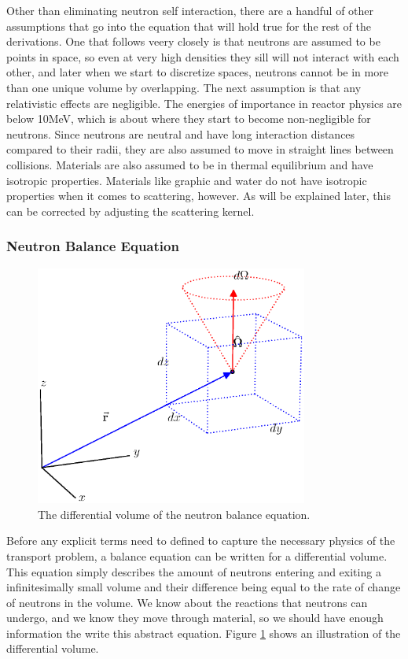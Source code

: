 Other than eliminating neutron self interaction, there are a handful of other assumptions that go into the equation that will hold true for the rest of the derivations.  One that follows veery closely is that neutrons are assumed to be points in space, so even at very high densities they sill will not interact with each other, and later when we start to discretize spaces, neutrons cannot be in more than one unique volume by overlapping.  The next assumption is that any relativistic effects are negligible.  The energies of importance in reactor physics are below 10MeV, which is about where they start to become non-negligible for neutrons.  Since neutrons are neutral and have long interaction distances compared to their radii, they are also assumed to move in straight lines between collisions.  Materials are also assumed to be in thermal equilibrium and have isotropic properties.  Materials like graphic and water do not have isotropic properties when it comes to scattering, however.  As will be explained later, this can be corrected by adjusting the scattering kernel.

\subsubsection{Neutron Balance Equation}

\begin{figure}[h!] 
  \centering
    \includegraphics[width=0.8\textwidth,trim= 0cm 2.5cm 0cm 0cm]{graphics/diff_balance.eps} 
     \caption{The differential volume of the neutron balance equation. \label{diff_volume}}
\end{figure}

Before any explicit terms need to defined to capture the necessary physics of the transport problem, a balance equation can be written for a differential volume.  This equation simply describes the amount of neutrons entering and exiting a infinitesimally small volume and their difference being equal to the rate of change of neutrons in the volume.  We know about the reactions that neutrons can undergo, and we know they move through material, so we should have  enough information the write this abstract equation. Figure \ref{diff_volume} shows an illustration of the differential volume.

